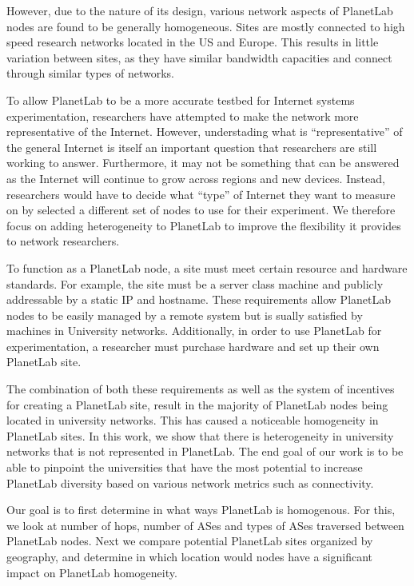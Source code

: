 \documentclass{sig-alternate-10pt}
\begin{document}
However, due to the nature of its design, various network aspects of PlanetLab
nodes are found to be generally homogeneous. Sites are mostly connected to high
speed research networks located in the US and Europe. This results in little
variation between sites, as they have similar bandwidth capacities and connect
through similar types of networks.

To allow PlanetLab to be a more accurate testbed for Internet systems
experimentation, researchers have attempted to make the network more
representative of the Internet. However, understading what is
``representative'' of the general Internet is itself an important question that
researchers are still working to answer. Furthermore, it may not be something
that can be answered as the Internet will continue to grow across regions and
new devices. Instead, researchers would have to decide what ``type'' of
Internet they want to measure on by selected a different set of nodes to use
for their experiment.  We therefore focus on adding heterogeneity to PlanetLab
to improve the flexibility it provides to network researchers.

To function as a PlanetLab node, a site must meet certain resource and hardware
standards. For example, the site must be a server class machine and publicly
addressable by a static IP and hostname.  These requirements allow PlanetLab
nodes to be easily managed by a remote system but is sually satisfied by
machines in University networks.  Additionally, in order to use PlanetLab for
experimentation, a researcher must purchase hardware and set up their own
PlanetLab site. 

The combination of both these requirements as well as the system of incentives
for creating a PlanetLab site, result in the majority of PlanetLab nodes being
located in university networks. This has caused a noticeable homogeneity in
PlanetLab sites.  In this work, we show that there is heterogeneity in
university networks that is not represented in PlanetLab. The end goal of our
work is to be able to pinpoint the universities that have the most potential to
increase PlanetLab diversity based on various network metrics such as
connectivity.

Our goal is to first determine in what ways PlanetLab is homogenous. For this,
we look at number of hops, number of ASes and types of ASes traversed between
PlanetLab nodes. Next we compare potential PlanetLab sites organized by
geography, and determine in which location would nodes have a significant
impact on PlanetLab homogeneity.
\end{document}
